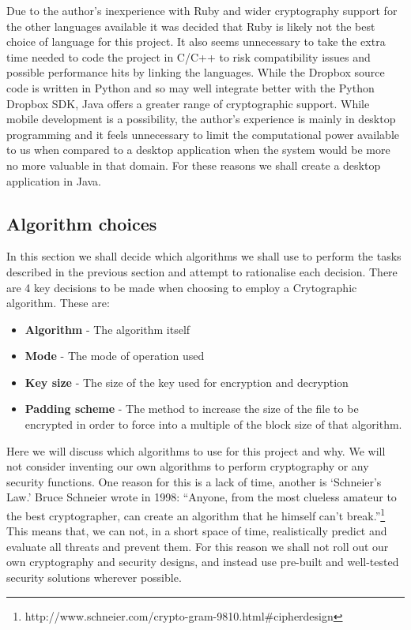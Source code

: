 \documentclass[12pt, titlepage]{article}
\begin{document}
\newline Due to the author's inexperience with Ruby and wider cryptography support for the other languages available it was decided that Ruby is likely not the best choice of language for this project. It also seems unnecessary to take the extra time needed to code the project in C/C++ to risk compatibility issues and possible performance hits by linking the languages. While the Dropbox source code is written in Python and so may well integrate better with the Python Dropbox SDK, Java offers a greater range of cryptographic support.
\newline \indent While mobile development is a possibility, the author's experience is mainly in desktop programming and it feels unnecessary to limit the computational power available to us when compared to a desktop application when the system would be more no more valuable in that domain.
\newline \indent For these reasons we shall create a desktop application in Java.

\subsection{Algorithm choices}
In this section we shall decide which algorithms we shall use to perform the tasks described in the previous section and attempt to rationalise each decision.
\newline \indent There are 4 key decisions to be made when choosing to employ a Crytographic algorithm. These are:
\begin{itemize}
	\item \textbf{Algorithm} - The algorithm itself
	\item \textbf{Mode} - The mode of operation used
	\item \textbf{Key size} - The size of the key used for encryption and decryption
	\item \textbf{Padding scheme} - The method to increase the size of the file to be encrypted in order to force into a multiple of the block size of that algorithm.
\end{itemize}
Here we will discuss which algorithms to use for this project and why.
\newline \indent We will not consider inventing our own algorithms to perform cryptography or any security functions. One reason for this is a lack of time, another is `Schneier's Law.' Bruce Schneier wrote in 1998: ``Anyone, from the most clueless amateur to the best cryptographer, can create an algorithm that he himself can't break.''\footnote{http://www.schneier.com/crypto-gram-9810.html\#cipherdesign} This means that, we can not, in a short space of time, realistically predict and evaluate all threats and prevent them. For this reason we shall not roll out our own cryptography and security designs, and instead use pre-built and well-tested security solutions wherever possible.
\end{document}
